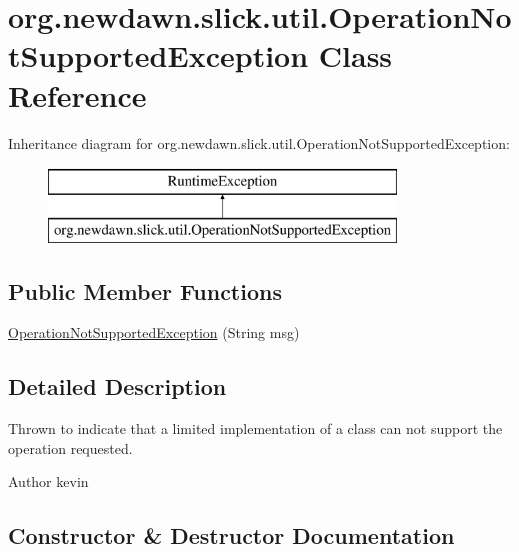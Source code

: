 \hypertarget{classorg_1_1newdawn_1_1slick_1_1util_1_1_operation_not_supported_exception}{}\section{org.\+newdawn.\+slick.\+util.\+Operation\+Not\+Supported\+Exception Class Reference}
\label{classorg_1_1newdawn_1_1slick_1_1util_1_1_operation_not_supported_exception}
Inheritance diagram for org.\+newdawn.\+slick.\+util.\+Operation\+Not\+Supported\+Exception\+:\begin{figure}[H]
\begin{center}
\leavevmode
\includegraphics[height=2.000000cm]{classorg_1_1newdawn_1_1slick_1_1util_1_1_operation_not_supported_exception}
\end{center}
\end{figure}
\subsection*{Public Member Functions}
\begin{DoxyCompactItemize}
\item 
\mbox{\hyperlink{classorg_1_1newdawn_1_1slick_1_1util_1_1_operation_not_supported_exception_a25e9bf7ac01430b33efd70f14cde088a}{Operation\+Not\+Supported\+Exception}} (String msg)
\end{DoxyCompactItemize}


\subsection{Detailed Description}
Thrown to indicate that a limited implementation of a class can not support the operation requested.

\begin{DoxyAuthor}{Author}
kevin 
\end{DoxyAuthor}


\subsection{Constructor \& Destructor Documentation}
\mbox{\label{classorg_1_1newdawn_1_1slick_1_1util_1_1_operation_not_supported_exception_a25e9bf7ac01430b33efd70f14cde088a}} 
